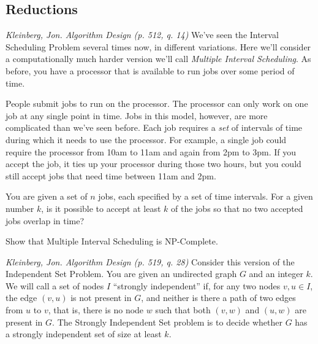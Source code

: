 \documentclass[solutionorbox]{exam} %
\begin{document}
\begin{center}
\end{center}
\vspace{0.1in}
 \qquad
{}



\begin{questions}

\section*{Reductions}

\question
\emph{Kleinberg, Jon. Algorithm Design (p. 512, q. 14)} 
We've seen the Interval Scheduling Problem several times now, in different variations. Here we'll consider a computationally much harder version we'll call \emph{Multiple Interval Scheduling}. As before, you have a processor that is available to run jobs over some period of time.

People submit jobs to run on the processor. The processor can only work on one job at any single point in time. Jobs in this model, however, are more complicated than we've seen before. Each job requires a \emph{set} of intervals of time during which it needs to use the processor. For example, a single job could require the processor from 10am to 11am and again from 2pm to 3pm. If you accept the job, it ties up your processor during those two hours, but you could still accept jobs that need time between 11am and 2pm.

You are given a set of $n$ jobs, each specified by a set of time intervals. For a given number $k$, is it possible to accept at least $k$ of the jobs so that no two accepted jobs overlap in time?

Show that Multiple Interval Scheduling is NP-Complete.

\begin{solutionbox}{}
\end{solutionbox}



\newpage
\question
\emph{Kleinberg, Jon. Algorithm Design (p. 519, q. 28)} 
Consider this version of the Independent Set Problem. You are given an undirected graph $G$ and an integer $k$. We will call a set of nodes $I$ ``strongly independent'' if, for any two nodes $v,u\in I$, the edge $(v,u)$ is not present in $G$, and neither is there a path of two edges from $u$ to $v$, that is, there is no node $w$ such that both $(v,w)$ and $(u,w)$ are present in $G$. The Strongly Independent Set problem is to decide whether $G$ has a strongly independent set of size at least $k$.


\end{questions}
\end{document}
